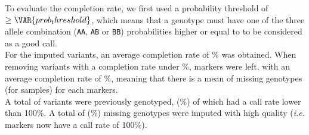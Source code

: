 
To evaluate the completion rate, we first used a probability threshold of
$\geq \VAR{ prob_threshold }$, which means that a genotype must have one of the
three allele combination (\texttt{AA}, \texttt{AB} or \texttt{BB})
probabilities higher or equal to  to be considered as a
good call.\\

For the  imputed variants, an average completion rate of
\% was obtained. When removing variants with a
completion rate under \%,  markers
were left, with an average completion rate of
\%, meaning that there is a mean of
 missing genotypes (for  samples) for
each markers.\\

A total of  variants were previously genotyped,
 (\%) of
which had  a call rate lower than 100\%. A total of
 (\%) missing
genotypes were imputed with high quality (\textit{i.e.}
 markers now have a call rate of 100\%).

